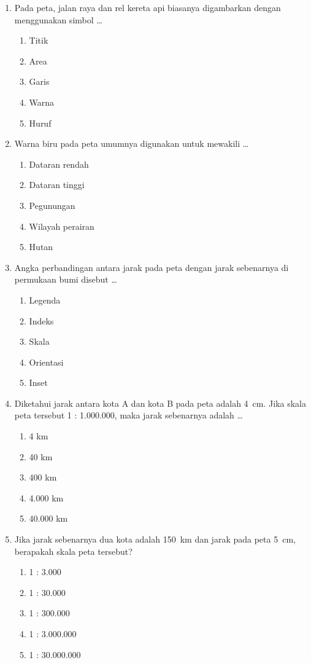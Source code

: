 \documentclass[12pt,a4paper]{article}
\begin{document}
\begin{enumerate}[leftmargin=*]
\item Pada peta, jalan raya dan rel kereta api biasanya digambarkan dengan menggunakan simbol \dots
    \begin{enumerate}[label=\alph*.]
        \item Titik
        \item Area
        \item Garis
        \item Warna
        \item Huruf
    \end{enumerate}

\item Warna biru pada peta umumnya digunakan untuk mewakili \dots
    \begin{enumerate}[label=\alph*.]
        \item Dataran rendah
        \item Dataran tinggi
        \item Pegunungan
        \item Wilayah perairan
        \item Hutan
    \end{enumerate}

\item Angka perbandingan antara jarak pada peta dengan jarak sebenarnya di permukaan bumi disebut \dots
    \begin{enumerate}[label=\alph*.]
        \item Legenda
        \item Indeks
        \item Skala
        \item Orientasi
        \item Inset
    \end{enumerate}

\item Diketahui jarak antara kota A dan kota B pada peta adalah 4~cm. Jika skala peta tersebut 1 : 1.000.000, maka jarak sebenarnya adalah \dots
    \begin{enumerate}[label=\alph*.]
        \item 4 km
        \item 40 km
        \item 400 km
        \item 4.000 km
        \item 40.000 km
    \end{enumerate}

\item Jika jarak sebenarnya dua kota adalah 150~km dan jarak pada peta 5~cm, berapakah skala peta tersebut?
    \begin{enumerate}[label=\alph*.]
        \item 1 : 3.000
        \item 1 : 30.000
        \item 1 : 300.000
        \item 1 : 3.000.000
        \item 1 : 30.000.000
    \end{enumerate}


\end{enumerate}
\end{document}

